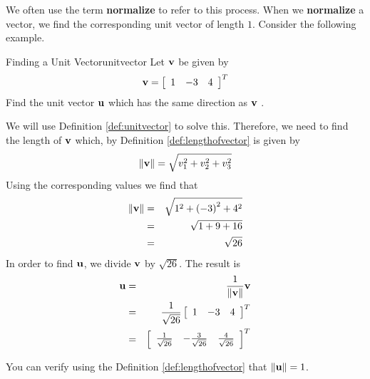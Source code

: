 We often use the term \textbf{normalize} to refer to this process. When we \textbf{normalize} a vector, we find the corresponding unit vector of length $1$. 
Consider the following example.

\begin{example}{Finding a Unit Vector}{unitvector}
Let ${\bf v}$ be given by 
\begin{equation*}
{\bf v}
=
\left[
\begin{array}{rrr}
1 & -3 & 4
\end{array}
\right]^T
\end{equation*}
Find the unit vector ${\bf u}$ which has the same direction as ${\bf v}$ .
\end{example}

\begin{solution}
We will use Definition \ref{def:unitvector} to solve this. 
Therefore, we need to find the length of ${\bf v}$ which, by Definition \ref{def:lengthofvector}
is given by 
\begin{equation*}
\|
{\bf v}
\|
= \sqrt{ v_{1}^2 + v_{2}^2+ v_{3}^2}
\end{equation*}
Using the corresponding  values we find that
\begin{eqnarray*}
\|
{\bf v}
\|
&=& \sqrt{ 1^2 + \left(-3 \right)^2 + 4^2} \\
&=& \sqrt{ 1 + 9 + 16} \\
&=& \sqrt{26} 
\end{eqnarray*}
In order to find ${\bf u}$, we divide ${\bf v}$ by $\sqrt{26}$.
The result is 
\begin{eqnarray*}
{\bf u}
&=&
\frac{1}{\| {\bf v} \|}
{\bf v} \\
&=&
\frac{1}{\sqrt{26}}
\left[
\begin{array}{rrr}
1 & -3 & 4
\end{array}
\right]^T \\
&=&
\left[
\begin{array}{rrr}
\frac{1}{\sqrt{26}} & -\frac{3}{\sqrt{26}} & \frac{4}{\sqrt{26}}
\end{array}
\right]^T
\end{eqnarray*}

You can verify using the Definition \ref{def:lengthofvector} that $\| {\bf u} \| = 1 $. 
\end{solution}